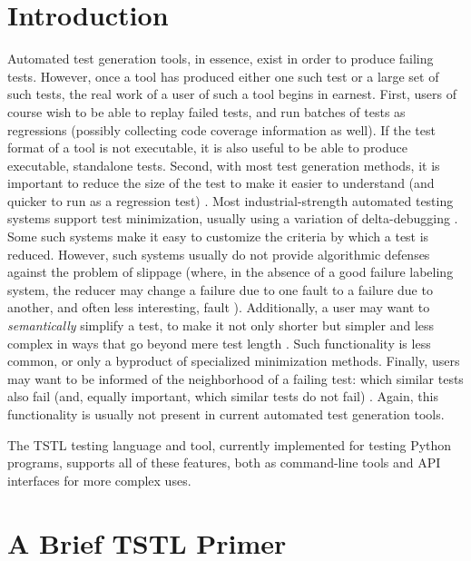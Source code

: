 \section{Introduction}

Automated test generation tools, in essence, exist in order to produce
failing tests.  However, once a tool has produced either one such test
or a large set of such tests, the real work of a user of such a tool
begins in earnest.  First, users of course wish to be able to replay
failed tests, and run batches of tests as regressions (possibly
collecting code coverage information as well).  If the test format of
a tool is not executable, it is also useful to be able to produce
executable, standalone tests.   Second, with most test generation methods, it is
important to reduce the size of the test to make it easier to
understand (and quicker to run as a regression test)
\cite{DD,MinUnit,TCminim,ICSEDiff,icst2014}.  Most industrial-strength
automated testing systems support test minimization, usually using a
variation of delta-debugging \cite{CReduce,hypothesis,lithium}.  Some
such systems make it easy to customize the criteria by which a test is reduced.
However, such systems usually do not provide algorithmic defenses
against the problem of slippage (where, in the absence of a good
failure labeling system, the reducer may change a failure due to one
fault to a failure due to another, and often less interesting, fault \cite{PLDI13,slippage}).
Additionally, a user may want to \emph{semantically} simplify a test, to
make it not only shorter but simpler and less complex in ways that go
beyond mere test length \cite{OneTest}.  Such functionality is less common, or only a
byproduct of specialized minimization methods.  Finally, users may
want to be informed of the neighborhood of a failing test:  which
similar tests also fail (and, equally important, which similar tests
do not fail) \cite{OneTest}.  Again, this functionality is usually not present in
current automated test generation tools.

The TSTL testing language and tool, currently implemented for testing
Python programs, supports all of these features, both as command-line
tools and API interfaces for more complex uses.

\section{A Brief TSTL Primer}


